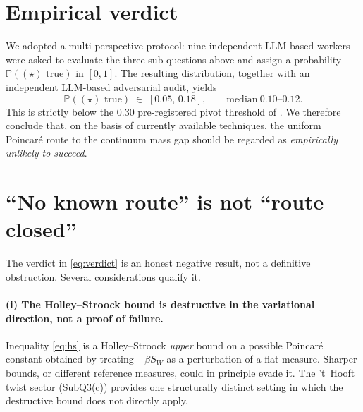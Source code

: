 \documentclass[11pt,a4paper]{amsart}
\theoremstyle{definition}
\theoremstyle{remark}
\begin{document}
\section{Empirical verdict}\label{sec:empirical}

We adopted a multi-perspective protocol: nine independent LLM-based workers were asked to evaluate the three sub-questions above and assign a probability $\mathbb{P}((\star)\text{ true})$ in $[0,1]$. The resulting distribution, together with an independent LLM-based adversarial audit, yields
\begin{equation}\label{eq:verdict}
\mathbb{P}((\star)\text{ true})\;\in\;[0.05,\,0.18],\qquad \text{median}\ 0.10\text{--}0.12.
\end{equation}
This is strictly below the $0.30$ pre-registered pivot threshold of \cite[\S 2]{Remondiere2026G4plan}. We therefore conclude that, on the basis of currently available techniques, the uniform Poincar\'e route to the continuum mass gap should be regarded as \emph{empirically unlikely to succeed}.

\section{``No known route'' is not ``route closed''}\label{sec:discussion}

The verdict in \eqref{eq:verdict} is an honest negative result, not a definitive obstruction. Several considerations qualify it.

\paragraph{(i) The Holley--Stroock bound is destructive in the variational direction, not a proof of failure.} Inequality \eqref{eq:hs} is a Holley--Stroock \emph{upper} bound on a possible Poincar\'e constant obtained by treating $-\beta S_W$ as a perturbation of a flat measure. Sharper bounds, or different reference measures, could in principle evade it. The 't~Hooft twist sector (SubQ3(c)) provides one structurally distinct setting in which the destructive bound does not directly apply.
\end{document}
